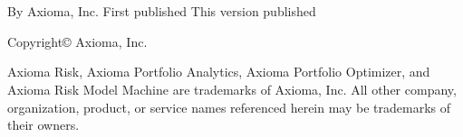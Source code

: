 \newpage
\begin{minipage}[b][8.75in][b]{5in}
	\section*{\mytitle}
	\begin{flushleft}
		\vspace{2mm}
		By Axioma, Inc.\newline
		First published \firstpubdate {}\newline
		This version published \date{\today}\newline
		Copyright\copyright{}  \the\year{} Axioma, Inc.
		
		\vspace{6mm}
		
		\begin{footnotesize}
			Axioma Risk, Axioma Portfolio Analytics, Axioma Portfolio \newline
			Optimizer, and Axioma Risk Model Machine are trademarks of\newline
			Axioma, Inc. All other company, organization, product, or \newline
			service names referenced herein may be trademarks of their\newline
			owners.
		\end{footnotesize}
	\end{flushleft}
\end{minipage}